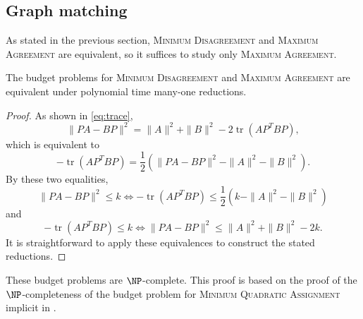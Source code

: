 \documentclass{article}
\newcommand{\1}{\mathbf{1}}
\newcommand{\MD}{\textsc{Minimum Disagreement}}
\renewcommand{\MA}{\textsc{Maximum Agreement}}
\DeclareMathOperator{\tr}{tr}
\begin{document}
\subsection{Graph matching}

As stated in the previous section, \MD{} and \MA{} are equivalent, so it suffices to study only \MA{}.

\begin{theorem}
  The budget problems for \MD{} and \MA{} are equivalent under polynomial time many-one reductions.
\end{theorem}
\begin{proof}
  As shown in \autoref{eq:trace},
  \begin{equation*}
    \|PA - BP\|^2 = \|A\|^2 + \|B\|^2 - 2 \tr(AP^TBP),
  \end{equation*}
  which is equivalent to
  \begin{equation*}
    -\tr(AP^TBP) = \frac{1}{2} (\|PA - BP\|^2 - \|A\|^2 - \|B\|^2).
  \end{equation*}
  By these two equalities,
  \begin{equation*}
    \|PA - BP\|^2 \leq k \iff -\tr(AP^TBP) \leq \frac{1}{2} (k - \|A\|^2 - \|B\|^2)
  \end{equation*}
  and
  \begin{equation*}
    -\tr(AP^TBP) \leq k \iff \|PA - BP\|^2 \leq \|A\|^2 + \|B\|^2 - 2k.
  \end{equation*}
  It is straightforward to apply these equivalences to construct the stated reductions.
\end{proof}

These budget problems are $\NP$-complete.
This proof is based on the proof of the $\NP$-completeness of the budget problem for \textsc{Minimum Quadratic Assignment} implicit in \autocite{sg76}.
\end{document}
